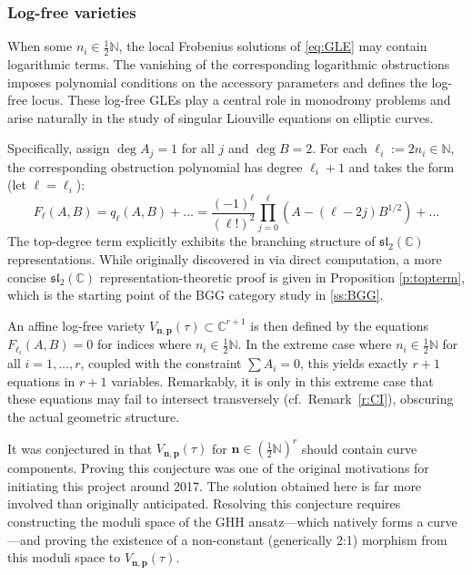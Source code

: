 \documentclass[11pt]{amsart}
\theoremstyle{remark}
\numberwithin{equation}{section}
\begin{document}
\subsubsection{Log-free varieties}

When some $n_i\in\frac12\mathbb{N}$, the local Frobenius solutions of \eqref{eq:GLE} may contain logarithmic terms. The vanishing of the corresponding logarithmic obstructions imposes polynomial conditions on the accessory parameters and defines the log-free locus. These log-free GLEs play a central role in monodromy problems and arise naturally in the study of singular Liouville equations on elliptic curves. 

Specifically, assign $\deg A_j = 1$ for all $j$ and $\deg B = 2$. For each $\ell_i := 2n_i \in \mathbb{N}$, the corresponding obstruction polynomial has degree $\ell_i + 1$ and takes the form (let $\ell = \ell_i$):
\[
F_\ell(A, B) = q_\ell(A, B) + \dots = \frac{(-1)^\ell}{(\ell !)^2}\prod_{j = 0}^\ell (A - (\ell - 2j)B^{1/2}) + \dots
\]
The top-degree term explicitly exhibits the branching structure of $\mathfrak{sl}_2(\mathbb{C})$ representations. While originally discovered in \cite{Wang_2020} via direct computation, a more concise $\mathfrak{sl}_2(\mathbb{C})$ representation-theoretic proof is given in Proposition \ref{p:topterm}, which is the starting point of the BGG category study in \ref{ss:BGG}. 

An affine log-free variety $V_{\mathbf{n},\mathbf{p}}(\tau) \subset \mathbb{C}^{r + 1}$ is then defined by the equations $F_{\ell_i}(A, B) = 0$ for indices where $n_i \in \tfrac12 \mathbb{N}$. In the extreme case where $n_i \in \tfrac12 \mathbb{N}$ for all $i = 1, \ldots, r$, coupled with the constraint $\sum A_i = 0$, this yields exactly $r + 1$ equations in $r + 1$ variables. Remarkably, it is only in this extreme case that these equations may fail to intersect transversely (cf.~Remark~\ref{r:CI}), obscuring the actual geometric structure.

It was conjectured in \cite{Wang_2020} that $V_{\mathbf{n},\mathbf{p}}(\tau)$ for $\mathbf{n} \in (\frac12 \mathbb{N})^r$ should contain curve components. Proving this conjecture was one of the original motivations for initiating this project around 2017. The solution obtained here is far more involved than originally anticipated. Resolving this conjecture requires constructing the moduli space of the GHH ansatz---which natively forms a curve---and proving the existence of a non-constant (generically 2:1) morphism from this moduli space to $V_{\mathbf{n},\mathbf{p}}(\tau)$.
\end{document}
